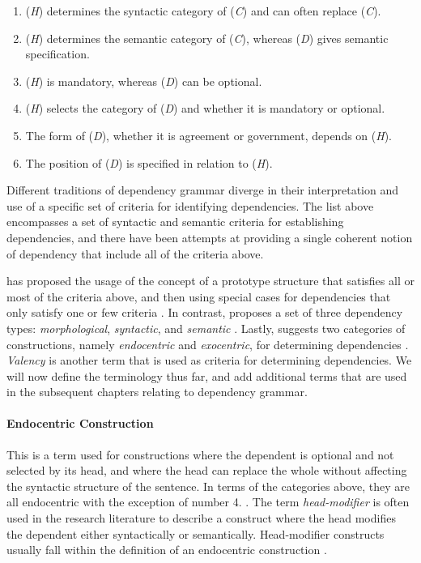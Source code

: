 \begin{enumerate}
\item (\textit{H}) determines the syntactic category of (\textit{C}) and can often replace (\textit{C}).
\item (\textit{H}) determines the semantic category of (\textit{C}), whereas (\textit{D}) gives semantic specification.
\item (\textit{H}) is mandatory, whereas (\textit{D}) can be optional.
\item (\textit{H}) selects the category of (\textit{D}) and whether it is mandatory or optional.
\item The form of (\textit{D}), whether it is agreement or government, depends on (\textit{H}).
\item The position of (\textit{D}) is specified in relation to (\textit{H}).
\end{enumerate}

Different traditions of dependency grammar diverge in their interpretation and use of a specific set of criteria for identifying dependencies. The list above encompasses a set of syntactic and semantic criteria for establishing dependencies, and there have been attempts at providing a single coherent notion of dependency that include all of the criteria above. 

\citeauthor{Hudson:90} has proposed the usage of the concept of a prototype structure that satisfies all or most of the criteria above, and then using special cases for dependencies that only satisfy one or few criteria \cite{Hudson:90}. In contrast, \citeauthor{Mel:88} proposes a set of three dependency types: \textit{morphological}, \textit{syntactic}, and \textit{semantic} \cite{Mel:88}. Lastly, \citeauthor{Nikula:86} suggests two categories of constructions, namely \textit{endocentric} and \textit{exocentric}, for determining dependencies \cite{Nikula:86}. \textit{Valency} is another term that is used as criteria for determining dependencies. We will now define the terminology thus far, and add additional terms that are used in the subsequent chapters relating to dependency grammar.

\paragraph{Endocentric Construction} This is a term used for constructions where the dependent is optional and not selected by its head, and where the head can replace the whole without affecting the syntactic structure of the sentence. In terms of the categories above, they are all endocentric with the exception of number 4. \cite{KublerEtAl:09}. The term \textit{head-modifier} is often used in the research literature to describe a construct where the head modifies the dependent either syntactically or semantically. Head-modifier constructs usually fall within the definition of an endocentric construction \cite{Niv:05}.

